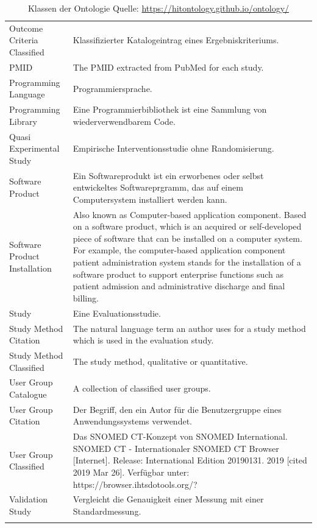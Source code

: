 \begin{longtable}[ht]{p{} p{8cm}}
Outcome Criteria Classified & Klassifizierter Katalogeintrag eines Ergebniskriteriums. \\
PMID & The PMID extracted from PubMed for each study. \\
Programming \newline Language & Programmiersprache. \\ 
Programming \newline Library & Eine Programmierbibliothek ist eine Sammlung von wiederverwendbarem Code. \\
Quasi Experimental Study & Empirische Interventionsstudie ohne Randomisierung. \\
Software Product & Ein Softwareprodukt ist ein erworbenes oder selbst entwickeltes Softwareprgramm, das auf einem Computersystem installiert werden kann. \\
Software Product \newline Installation & Also known as Computer-based application component. Based on a software product, which is an acquired or self-developed piece of software that can be installed on a computer system. For example, the computer-based application component patient administration system stands for the installation of a software product to support enterprise functions such as patient admission and administrative discharge and final billing. \\
Study & Eine Evaluationsstudie. \\
Study Method \newline Citation & The natural language term an author uses for a study method which is used in the evaluation study. \\
Study Method \newline Classified & The study method, qualitative or quantitative. \\
User Group \newline Catalogue & A collection of classified user groups. \\
User Group Citation & Der Begriff, den ein Autor für die Benutzergruppe eines Anwendungssystems verwendet. \\
User Group \newline Classified & Das SNOMED CT-Konzept von SNOMED International. SNOMED CT - Internationaler SNOMED CT Browser [Internet]. Release: International Edition 20190131. 2019 [cited 2019 Mar 26]. Verfügbar unter: https://browser.ihtsdotools.org/? \\
Validation Study & Vergleicht die Genauigkeit einer Messung mit einer Standardmessung.\\
\bottomrule
\caption[Klassen der Ontologie]{Klassen der Ontologie \newline \small Quelle: \url{https://hitontology.github.io/ontology/}}
\label{tab:hito_klassen}
\end{longtable}

